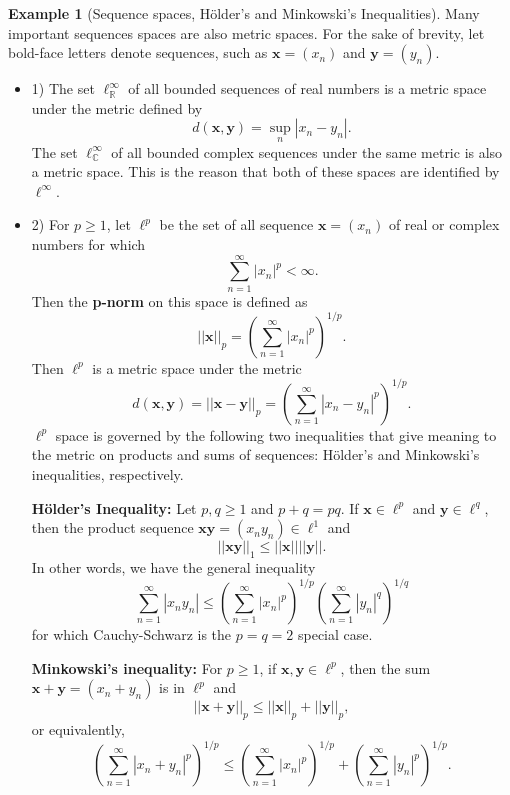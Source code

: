 \documentclass[psamsfonts]{amsart}
\theoremstyle{definition}
\newtheorem{exmp}[thm]{Example}
\theoremstyle{remark}
\numberwithin{equation}{section}
\begin{document}
\begin{exmp}[Sequence spaces, H\"{o}lder's and Minkowski's Inequalities]
Many important sequences spaces are also metric spaces. For the sake of brevity, let bold-face letters denote sequences, such as $\textbf{x} = (x_n)$ and $\textbf{y} = (y_n).$ 
\begin{itemize}
    \item 1) The set $\ell ^{\infty} _{\mathbb{R}}$ of all bounded sequences of real numbers is a metric space under the metric defined by 
    $$d( \textbf{x}, \textbf{y}) = \sup _{n} | x_n - y_n|.$$
    The set $\ell ^{\infty} _{\mathbb{C}}$ of all bounded complex sequences under the same metric is also a metric space. This is the reason that both of these spaces are identified by $\ell ^ \infty$. 
    \item 2) For $p \geq 1$, let $\ell ^p$ be the set of all sequence $\textbf{x} = (x_n)$ of real or complex numbers for which 
    $$\sum ^\infty _{ n =1} |x_n| ^p < \infty. $$
    Then the \textbf{p-norm} on this space is defined as
    $$||\textbf{x} || _p = \left( \sum ^\infty _{n = 1} |x_n| ^p\right) ^{1/p} .$$
    Then $\ell ^p$ is a metric space under the metric 
    $$d(\textbf{x}, \textbf{y}) = || \textbf{x} - \textbf{y}||_p = \left( \sum ^\infty _{n = 1} |x_n - y_n |^p\right) ^{1/p}.$$
    $\ell^p$ space is governed by the following two inequalities that give meaning to the metric on products and sums of sequences: H\"{o}lder's and Minkowski's inequalities, respectively. 
    
    \textbf{H\"{o}lder's Inequality: } Let $p, q \geq 1$ and $p+q = pq$. If $\textbf{x} \in \ell ^p$ and $\textbf{y} \in \ell ^q$, then the product sequence $\textbf{xy} = (x_ny_n) \in \ell ^1$ and 
    $$|| \textbf{xy} || _1 \leq ||\textbf{x}|| ||\textbf{y}||.$$
    In other words, we have the general inequality 
    $$\sum _{n = 1} ^\infty |x_n y_n| \leq \left( \sum _{n=1}^\infty |x_n|^p\right)^{1/p} \left( \sum _{n = 1} ^\infty |y_n|^q \right) ^{1/q} $$
    for which Cauchy-Schwarz is the $p=q=2$ special case. 
    
    \textbf{Minkowski's inequality:} For $p \geq 1$, if $\textbf{x},\textbf{y} \in \ell ^p$, then the sum $\textbf{x} + \textbf{y} = (x_n + y_n)$ is in $\ell ^p$ and 
    $$||\textbf{x} + \textbf{y} ||_p \leq || \textbf{x} || _p + || \textbf{y}|| _p,$$
    or equivalently, 
    $$\left( \sum _{n = 1} ^\infty |x_n +  y_n|^p \right) ^{1/p} \leq \left( \sum _{n=1}^\infty |x_n|^p\right)^{1/p} + \left( \sum _{n = 1} ^\infty |y_n|^p \right) ^{1/p}.$$
    
\end{itemize}
\end{exmp}
\end{document}
